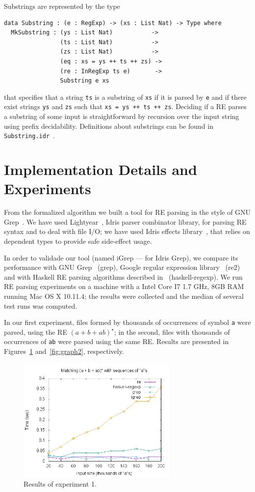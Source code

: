 \documentclass{llncs}
\newcommand{\idris}[1]{\texttt{#1}}%
\begin{document}
Substrings are represented by the type
\begin{verbatim}
data Substring : (e : RegExp) -> (xs : List Nat) -> Type where
  MkSubstring : (ys : List Nat)           ->
                (ts : List Nat)           ->
                (zs : List Nat)           ->
                (eq : xs = ys ++ ts ++ zs) ->
                (re : InRegExp ts e)       ->
                Substring e xs
\end{verbatim}
that specifies that a string \idris{ts} is a substring of \idris{xs}
if it is parsed by \idris{e} and if there exist strings \idris{ys} and
\idris{zs} such that \idris{xs = ys ++ ts ++ zs}. Deciding if a RE
parses a substring of some input is straightforward by recursion over
the input string using prefix decidability. Definitions about
substrings can be found in \texttt{Substring.idr}~\cite{regex-rep}.

\section{Implementation Details and Experiments}\label{sec:exp}

From the formalized algorithm we built a tool for RE parsing in the
style of GNU Grep~\cite{Grep}. We have used
Lightyear~\cite{lightyear}, Idris parser combinator library, for
parsing RE syntax and to deal with file I/O; we have used Idris
effects library~\cite{Brady2013a}, that relies on dependent types to
provide safe side-effect usage.

In order to validade our tool (named iGrep --- for Idris Grep), we
compare its performance with GNU Grep~\cite{Grep} (grep), Google
regular expression library~\cite{re2} (re2) and with Haskell RE
parsing algorithms described in~\cite{Fischer2010} (haskell-regexp).
We run RE parsing experiments on a machine with a Intel Core I7 1.7
GHz, 8GB RAM running Mac OS X 10.11.4; the results were collected and
the median of several test runs was computed.

In our first experiment, files formed by thousands of occurrences of
symbol \texttt{a} were parsed, using the RE $(a + b + ab)^\star$; in
the second, files with thousands of occurrences of \texttt{ab} were
parsed using the same RE. Results are presented in
Figures~\ref{fig:graph1} and~\ref{fig:graph2}, respectively.

\begin{figure}[!ht]
    \includegraphics[width=0.7\textwidth]{as.png}
   \centering
   \caption{Results of experiment 1.}
   \label{fig:graph1}
\end{figure}
\end{document}
